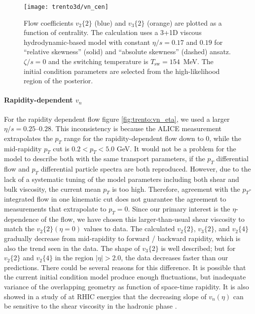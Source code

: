 \begin{figure}
\singlespacing 
\centering
\texttt{[image: trento3d/vn\_cen]}
\caption[Flow coefficients $v_2\{2\}$ (blue) and $v_3\{2\}$ (orange) are plotted as]{Flow coefficients $v_2\{2\}$ (blue) and $v_3\{2\}$ (orange) are plotted as a function of centrality. The calculation uses a 3+1D viscous hydrodynamic-based model with constant $\eta/s=0.17$ and $0.19$ for ``relative skewness'' (solid) and ``absolute skewness'' (dashed) ansatz. $\zeta/s=0$ and the switching temperature is $T_\text{sw}=154$~MeV.
The initial condition parameters are selected from the high-likelihood region of the posterior.}
\label{fig:trento:vn_cen}
\end{figure}

\paragraph{Rapidity-dependent $v_n$} For the rapidity dependent flow figure \ref{fig:trento:vn_eta}, we used a larger $\eta/s=0.25$--$0.28$. 
This inconsistency is because the ALICE measurement extrapolates the $p_T$ range for the rapidity-dependent flow down to 0, while the mid-rapidity  $p_T$ cut is $0.2 < p_T < 5.0$ GeV.
It would not be a problem for the model to describe both with the same transport parameters, if the $p_T$ differential flow and $p_T$ differential particle spectra are both reproduced.
However, due to the lack of a systematic tuning of the model parameters including both shear and bulk viscosity, the current mean $p_T$ is too high.
Therefore, agreement with the $p_T$-integrated flow in one kinematic cut does not guarantee the agreement to measurements that extrapolate to $p_T = 0$.
Since our primary interest is the $\eta$-dependence of the flow, we have chosen this larger-than-usual shear viscosity to match the $v_2\{2\}(\eta=0)$ values to data.
The calculated $v_2\{2\}$, $v_3\{2\}$, and $v_2\{4\}$ gradually decrease from mid-rapidity to forward / backward rapidity, which is also the trend seen in the data.
The shape of $v_3\{2\}$ is well described; but for $v_2\{2\}$ and $v_2\{4\}$ in the region $|\eta| > 2.0$, the data decreases faster than our predictions.
There could be several reasons for this difference.
It is possible that the current initial condition model produce enough fluctuations, but inadequate variance of the overlapping geometry as function of space-time rapidity.
It is also showed in a study of at RHIC energies that the decreasing slope of $v_n(\eta)$ can be sensitive to the shear viscosity in the hadronic phase \cite{Denicol:2015bnf, Bozek:2010bi}.
